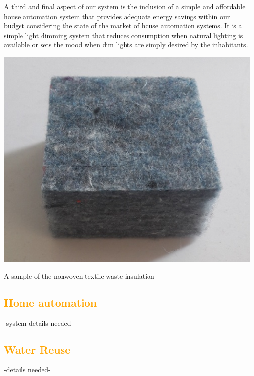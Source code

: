 \documentclass[justified]{tufte-book}
\begin{document}
\par
A third and final aspect of our system is the inclusion of a simple and affordable house automation system that provides adequate energy savings within our budget considering the state of the market of house automation systems. It is a simple light dimming system that reduces consumption when natural lighting is available or sets the mood when dim lights are simply desired by the inhabitants.

\begin{marginfigure}
    \includegraphics[width=\textwidth]{insul}
    \caption{A sample of the nonwoven textile waste insulation}
\end{marginfigure}

	\textcolor{orange}{\chapter{Home automation}}
	-system details needed-
	\textcolor{orange}{\chapter{Water Reuse}}
	-details needed-
	
	
	
	
\end{document}
